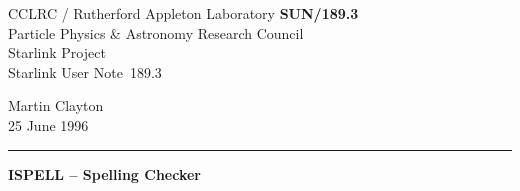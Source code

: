 \documentclass[twoside,11pt]{article}
\newcommand{\stardoccategory}  {Starlink User Note}
\newcommand{\stardocinitials}  {SUN}
\newcommand{\stardocnumber}    {189.3}
\newcommand{\stardocauthors}   {Martin Clayton}
\newcommand{\stardocdate}      {25 June 1996}
\newcommand{\stardoctitle}     {ISPELL \sunspec{--}{-} Spelling Checker}
\newcommand{\stardocversion}   {[software-version]}
\newcommand{\stardocmanual}    {[manual-type]}
\newcommand{\stardocname}{\stardocinitials /\stardocnumber}
\newenvironment{latexonly}{}{}
\newcommand{\sunspec}[2]{#1}
\newcommand{\sunspec}[2]{#2}
\begin{document}
\thispagestyle{empty}

\begin{latexonly}
   CCLRC / {\sc Rutherford Appleton Laboratory} \hfill {\bf \stardocname}\\
   {\large Particle Physics \& Astronomy Research Council}\\
   {\large Starlink Project\\}
   {\large \stardoccategory\ \stardocnumber}
   \begin{flushright}
   \stardocauthors\\
   \stardocdate
   \end{flushright}
   \vspace{-4mm}
   \rule{\textwidth}{0.5mm}
   \vspace{5mm}
   \begin{center}
   {\Huge\bf  \stardoctitle \\ [2.5ex]}
   \end{center}
   \vspace{5mm}

   \begin{center}
   \leavevmode\epsfysize=100mm
   \end{center}

\end{latexonly}
\end{document}
